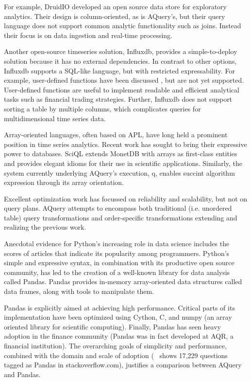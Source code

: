 \documentclass{acm_proc_article-sp}
\begin{document}
For example, DruidIO\cite{yang2014druid} 
developed an open source data store for
exploratory analytics. Their design is column-oriented, as is AQuery's,
but their query language does not support
common analytic functionality such as joins. 
Instead their focus is on data ingestion and real-time processing.

Another open-source timeseries solution, Influxdb, provides a
simple-to-deploy solution because it has
no external dependencies\cite{influxdb}.
In contrast to other options, Influxdb supports a SQL-like language, but 
with restricted expressability.
For example,
user-defined functions have been discussed
\cite{influxdb_github_customfuns}, 
but are not yet supported.
User-defined functions are useful to implement readable and efficient
analytical tasks such as financial trading strategies.
Further, Influxdb does not support
sorting a table by multiple columns, which complicates queries
for multidimensional time series data\cite{influxdb_github_sorting}.

Array-oriented languages, often based on APL,
have long held a prominent position in time series analytics.
Recent work has sought to bring their expressive power to databases. SciQL\cite{kersten2011sciql}
extends MonetDB\cite{nes2012monetdb} 
with arrays as first-class entities and provides
elegant idioms for their use in scientific applications. 
Similarly, the system currently underlying
AQuery's execution, q\cite{kxsystems}, enables succint algorithm 
expression through its
array orientation.

Excellent optimization work has 
focussed on reliability 
and scalability\cite{pelkonen2015gorilla}\cite{opentsdb}, 
but not on query plans. AQuery attempts to encompass both
traditional (i.e. unordered table) query transformations 
and order-specific transformations extending and 
realizing the previous work\cite{lernershashaaquery}.

Anecdotal evidence for Python's increasing role in data science includes
the scores of articles\cite{ieeespectrum} that 
indicate its popularity among programmers.
Python's simple and expressive syntax, in combination with its  productive open source community, has led to
the creation of a well-known library for 
data analysis called Pandas. Pandas
provides in-memory array-oriented data structures called data frames\cite{pandasdocs}, along with tools to manipulate them. 

Pandas is explicitly aimed at achieving high performance.
Critical parts of its implementation have been optimized using Cython, C, and numpy (an array oriented library for scientific computing)\cite{numpyguide}.  Finally, Pandas has seen heavy adoption in the finance community 
(Pandas was in fact developed at AQR, a financial institution). The overarching goals of simplicity and performance, combined with the domain and scale of adoption (~\cite{pandas-stackoverflow} shows 17,229 questions tagged as Pandas in stackoverflow.com), justifies a comparison between AQuery and Pandas.
\end{document}
